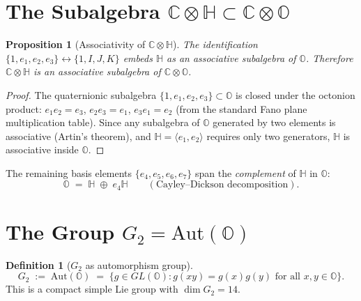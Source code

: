 \documentclass[12pt,a4paper]{article}
\newtheorem{proposition}[theorem]{Proposition}
\theoremstyle{definition}
\newtheorem{definition}[theorem]{Definition}
\theoremstyle{remark}
\begin{document}
\section{The Subalgebra $\mathbb{C}\otimes\mathbb{H} \subset \mathbb{C}\otimes\mathbb{O}$}
\label{sec:subalgebra}

\begin{proposition}[Associativity of $\mathbb{C}\otimes\mathbb{H}$]
\label{prop:assoc}
The identification $\{1, e_1, e_2, e_3\} \leftrightarrow \{1, I, J, K\}$
embeds $\mathbb{H}$ as an associative subalgebra of $\mathbb{O}$.  Therefore
$\mathbb{C}\otimes\mathbb{H}$ is an associative subalgebra of $\mathbb{C}\otimes\mathbb{O}$.
\end{proposition}

\begin{proof}
The quaternionic subalgebra $\{1, e_1, e_2, e_3\} \subset \mathbb{O}$ is
closed under the octonion product: $e_1 e_2 = e_3$, $e_2 e_3 = e_1$,
$e_3 e_1 = e_2$ (from the standard Fano plane multiplication table).
Since any subalgebra of $\mathbb{O}$ generated by two elements is
associative (Artin's theorem), and $\mathbb{H} = \langle e_1, e_2\rangle$
requires only two generators, $\mathbb{H}$ is associative inside $\mathbb{O}$.
\end{proof}

The remaining basis elements $\{e_4, e_5, e_6, e_7\}$ span the
\emph{complement} of $\mathbb{H}$ in $\mathbb{O}$:
\begin{equation}
  \mathbb{O} \;=\; \mathbb{H} \;\oplus\; e_4\mathbb{H}
  \qquad (\text{Cayley--Dickson decomposition}).
\end{equation}

\section{The Group $G_2 = \mathrm{Aut}(\mathbb{O})$}
\label{sec:g2}

\begin{definition}[$G_2$ as automorphism group]
\begin{equation}
  G_2 \;:=\; \mathrm{Aut}(\mathbb{O})
       \;=\; \{g\in GL(\mathbb{O}) : g(xy) = g(x)g(y) \text{ for all } x,y\in\mathbb{O}\}.
\end{equation}
This is a compact simple Lie group with $\dim G_2 = 14$.
\end{definition}
\end{document}

